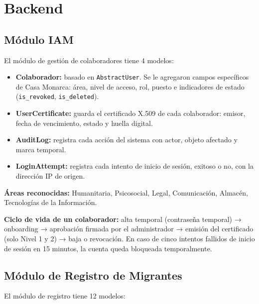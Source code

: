 \documentclass[10pt,letterpaper]{report}
\begin{document}
\section{Backend}

\subsection{Módulo IAM}

El módulo de gestión de colaboradores tiene 4 modelos:

\begin{itemize}
    \item \textbf{Colaborador:} basado en \texttt{AbstractUser}. Se le agregaron campos específicos de Casa Monarca: área, nivel de acceso, rol, puesto e indicadores de estado (\texttt{is\_revoked}, \texttt{is\_deleted}).
    \item \textbf{UserCertificate:} guarda el certificado X.509 de cada colaborador: emisor, fecha de vencimiento, estado y huella digital.
    \item \textbf{AuditLog:} registra cada acción del sistema con actor, objeto afectado y marca temporal.
    \item \textbf{LoginAttempt:} registra cada intento de inicio de sesión, exitoso o no, con la dirección IP de origen.
\end{itemize}

\textbf{Áreas reconocidas:} Humanitaria, Psicosocial, Legal, Comunicación, Almacén, Tecnologías de la Información.

\textbf{Ciclo de vida de un colaborador:} alta temporal (contraseña temporal) → onboarding → aprobación firmada por el administrador → emisión del certificado (solo Nivel 1 y 2) → baja o revocación. En caso de cinco intentos fallidos de inicio de sesión en 15 minutos, la cuenta queda bloqueada temporalmente.

\subsection{Módulo de Registro de Migrantes}

El módulo de registro tiene 12 modelos:
\end{document}
